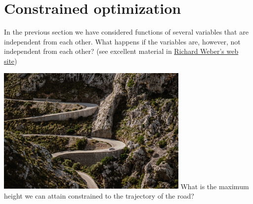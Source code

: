 \documentclass[c]{beamer}
\begin{document}
\section{Constrained optimization}
\begin{frame}
In the previous section we have considered functions of several variables that are independent from each other. What happens if the variables are, however, not independent from each other? (see excellent material in \href{https://www.statslab.cam.ac.uk/~rrw1/}{Richard Weber's web site})

  \begin{center}
    \includegraphics[width=0.7\textwidth]{../figures/mallorca.jpg}\newline
    What is the maximum height we can attain constrained to the trajectory of the road?
  \end{center}

\end{frame}

\end{document}
